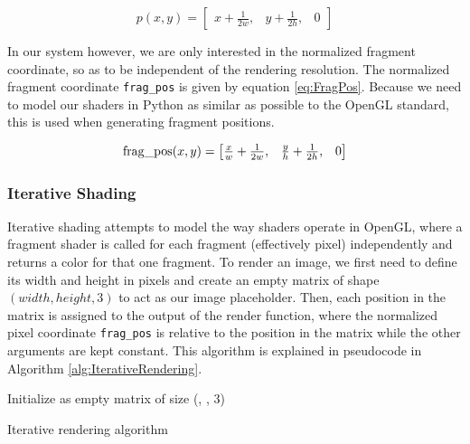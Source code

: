 \begin{equation}\label{eq:UnnormalizedFragPos}
p(x,y) = \begin{bmatrix}x + \frac{1}{2w}, & y + \frac{1}{2h}, & 0\end{bmatrix}
\end{equation}

In our system however, we are only interested in the normalized fragment coordinate, so as to be independent of the rendering resolution. The normalized fragment coordinate \texttt{frag\_pos} is given by equation \ref{eq:FragPos}. Because we need to model our shaders in Python as similar as possible to the OpenGL standard, this is used when generating fragment positions.

\begin{equation}\label{eq:FragPos}
    \operatorname{frag\_pos}(x,y) = \begin{bmatrix}\frac{x}{w} + \frac{1}{2w}, & \frac{y}{h} + \frac{1}{2h}, & 0\end{bmatrix}
\end{equation}


\subsubsection{Iterative Shading}\label{sec:MethodIterativeRendering}

Iterative shading attempts to model the way shaders operate in OpenGL, where a fragment shader is called for each fragment (effectively pixel) independently and returns a color for that one fragment. To render an image, we first need to define its width and height in pixels and create an empty matrix of shape $(width, height, 3)$ to act as our image placeholder. Then, each position in the matrix is assigned to the output of the render function, where the normalized pixel coordinate \texttt{frag\_pos} is relative to the position in the matrix while the other arguments are kept constant. This algorithm is explained in pseudocode in Algorithm \ref{alg:IterativeRendering}. 

\begin{algorithm}[H]


\BlankLine
Initialize \Img as empty matrix of size (\Width, \Height, 3)\;

\Return \Img\;
\caption{Iterative rendering algorithm}
\label{alg:IterativeRendering}
\end{algorithm}

